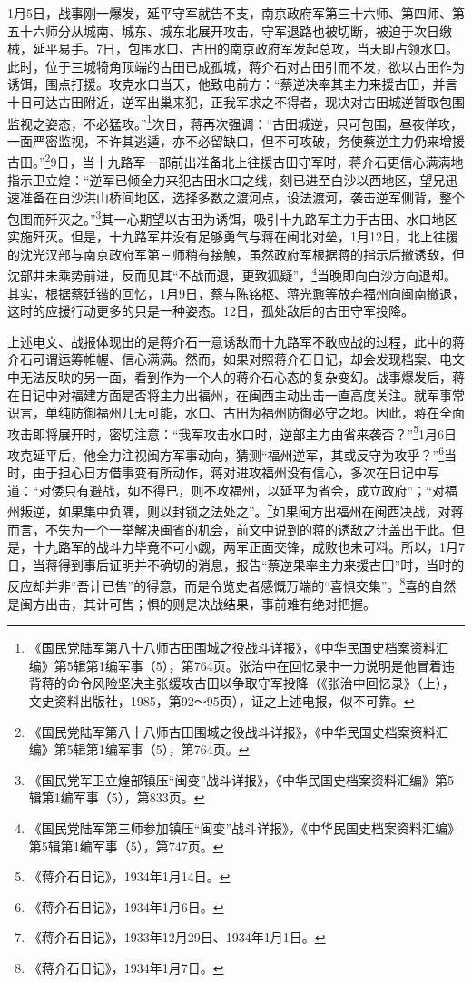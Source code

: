 1月5日，战事刚一爆发，延平守军就告不支，南京政府军第三十六师、第四师、第五十六师分从城南、城东、城东北展开攻击，守军退路也被切断，被迫于次日缴械，延平易手。7日，包围水口、古田的南京政府军发起总攻，当天即占领水口。此时，位于三城犄角顶端的古田已成孤城，蒋介石对古田引而不发，欲以古田作为诱饵，围点打援。攻克水口当天，他致电前方：“蔡逆决率其主力来援古田，并言十日可达古田附近，逆军出巢来犯，正我军求之不得者，现决对古田城逆暂取包围监视之姿态，不必猛攻。”\footnote{《国民党陆军第八十八师古田围城之役战斗详报》，《中华民国史档案资料汇编》第5辑第1编军事（5），第764页。张治中在回忆录中一力说明是他冒着违背蒋的命令风险坚决主张缓攻古田以争取守军投降（《张治中回忆录》（上），文史资料出版社，1985，第92～95页），证之上述电报，似不可靠。}次日，蒋再次强调：“古田城逆，只可包围，昼夜佯攻，一面严密监视，不许其逃遁，亦不必留缺口，但不可攻破，务使蔡逆主力仍来增援古田。”\footnote{《国民党陆军第八十八师古田围城之役战斗详报》，《中华民国史档案资料汇编》第5辑第1编军事（5），第764页。}9日，当十九路军一部前出准备北上往援古田守军时，蒋介石更信心满满地指示卫立煌：“逆军已倾全力来犯古田水口之线，刻已进至白沙以西地区，望兄迅速准备在白沙洪山桥间地区，选择多数之渡河点，设法渡河，袭击逆军侧背，整个包围而歼灭之。”\footnote{《国民党军卫立煌部镇压“闽变”战斗详报》，《中华民国史档案资料汇编》第5辑第1编军事（5），第833页。}其一心期望以古田为诱饵，吸引十九路军主力于古田、水口地区实施歼灭。但是，十九路军并没有足够勇气与蒋在闽北对垒，1月12日，北上往援的沈光汉部与南京政府军第三师稍有接触，虽然政府军根据蒋的指示后撤诱敌，但沈部并未乘势前进，反而见其“不战而退，更致狐疑”，\footnote{《国民党陆军第三师参加镇压“闽变”战斗详报》，《中华民国史档案资料汇编》第5辑第1编军事（5），第747页。}当晚即向白沙方向退却。其实，根据蔡廷锴的回忆，1月9日，蔡与陈铭枢、蒋光鼐等放弃福州向闽南撤退，这时的应援行动更多的只是一种姿态。12日，孤处敌后的古田守军投降。


上述电文、战报体现出的是蒋介石一意诱敌而十九路军不敢应战的过程，此中的蒋介石可谓运筹帷幄、信心满满。然而，如果对照蒋介石日记，却会发现档案、电文中无法反映的另一面，看到作为一个人的蒋介石心态的复杂变幻。战事爆发后，蒋在日记中对福建方面是否将主力出福州，在闽西主动出击一直高度关注。就军事常识言，单纯防御福州几无可能，水口、古田为福州防御必守之地。因此，蒋在全面攻击即将展开时，密切注意：“我军攻击水口时，逆部主力由省来袭否？”\footnote{《蒋介石日记》，1934年1月14日。}1月6日攻克延平后，他全力注视闽方军事动向，猜测“福州逆军，其或反守为攻乎？”\footnote{《蒋介石日记》，1934年1月6日。}当时，由于担心日方借事变有所动作，蒋对进攻福州没有信心，多次在日记中写道：“对倭只有避战，如不得已，则不攻福州，以延平为省会，成立政府”；“对福州叛逆，如果集中负隅，则以封锁之法处之”。\footnote{《蒋介石日记》，1933年12月29日、1934年1月1日。}如果闽方出福州在闽西决战，对蒋而言，不失为一个一举解决闽省的机会，前文中说到的蒋的诱敌之计盖出于此。但是，十九路军的战斗力毕竟不可小觑，两军正面交锋，成败也未可料。所以，1月7日，当蒋得到事后证明并不确切的消息，报告“蔡逆果率主力来援古田”时，当时的反应却并非“吾计已售”的得意，而是令览史者感慨万端的“喜惧交集”。\footnote{《蒋介石日记》，1934年1月7日。}喜的自然是闽方出击，其计可售；惧的则是决战结果，事前难有绝对把握。


